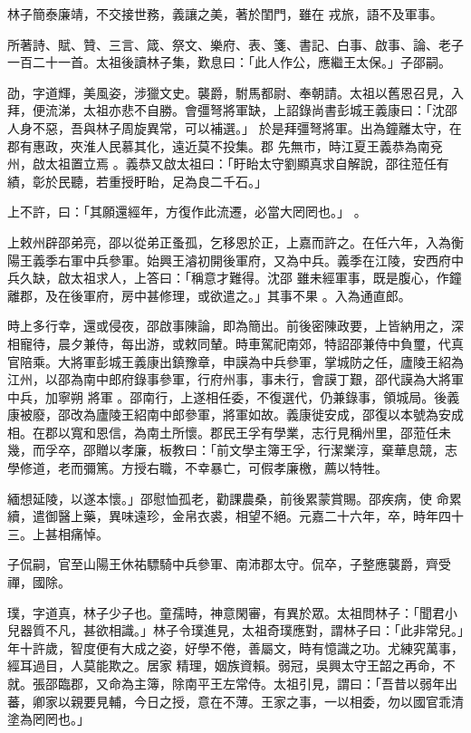\begin{pinyinscope}
 林子簡泰廉靖，不交接世務，義讓之美，著於閨門，雖在
 戎旅，語不及軍事。



 所著詩、賦、贊、三言、箴、祭文、樂府、表、箋、書記、白事、啟事、論、老子一百二十一首。太祖後讀林子集，歎息曰：「此人作公，應繼王太保。」子邵嗣。


劭，字道輝，美風姿，涉獵文史。襲爵，駙馬都尉、奉朝請。太祖以舊恩召見，入拜，便流涕，太祖亦悲不自勝。會彊弩將軍缺，上詔錄尚書彭城王義康曰：「沈邵人身不惡，吾與林子周旋異常，可以補選。」
 於是拜彊弩將軍。出為鐘離太守，在郡有惠政，夾淮人民慕其化，遠近莫不投集。郡
 先無市，時江夏王義恭為南兗州，啟太祖置立焉
 。義恭又啟太祖曰：「盱眙太守劉顯真求自解說，邵往蒞任有績，彰於民聽，若重授盱眙，足為良二千石。」


上不許，曰：「其願還經年，方復作此流遷，必當大罔罔也。」
 。


上敕州辟邵弟亮，邵以從弟正蚤孤，乞移恩於正，上嘉而許之。在任六年，入為衡陽王義季右軍中兵參軍。始興王濬初開後軍府，又為中兵。義季在江陵，安西府中兵久缺，啟太祖求人，上答曰：「稱意才難得。沈邵
 雖未經軍事，既是腹心，作鐘離郡，及在後軍府，房中甚修理，或欲遣之。」其事不果
 。入為通直郎。


時上多行幸，還或侵夜，邵啟事陳論，即為簡出。前後密陳政要，上皆納用之，深相寵待，晨夕兼侍，每出游，或敕同輦。時車駕祀南郊，特詔邵兼侍中負璽，代真官陪乘。大將軍彭城王義康出鎮豫章，申謨為中兵參軍，掌城防之任，廬陵王紹為江州，以邵為南中郎府錄事參軍，行府州事，事未行，會謨丁艱，邵代謨為大將軍中兵，加寧朔
 將軍
 。邵南行，上遂相任委，不復選代，仍兼錄事，領城局。後義康被廢，邵改為廬陵王紹南中郎參軍，將軍如故。義康徙安成，邵復以本號為安成相。在郡以寬和恩信，為南土所懷。郡民王孚有學業，志行見稱州里，邵蒞任未幾，而孚卒，邵贈以孝廉，板教曰：「前文學主簿王孚，行潔業淳，棄華息競，志學修道，老而彌篤。方授右職，不幸暴亡，可假孝廉檄，薦以特牲。



 緬想延陵，以遂本懷。」邵慰恤孤老，勸課農桑，前後累蒙賞賜。邵疾病，使
 命累續，遣御醫上藥，異味遠珍，金帛衣裘，相望不絕。元嘉二十六年，卒，時年四十三。上甚相痛悼。



 子侃嗣，官至山陽王休祐驃騎中兵參軍、南沛郡太守。侃卒，子整應襲爵，齊受禪，國除。



 璞，字道真，林子少子也。童孺時，神意閑審，有異於眾。太祖問林子：「聞君小兒器質不凡，甚欲相識。」林子令璞進見，太祖奇璞應對，謂林子曰：「此非常兒。」年十許歲，智度便有大成之姿，好學不倦，善屬文，時有憶識之功。尤練究萬事，經耳過目，人莫能欺之。居家
 精理，姻族資賴。弱冠，吳興太守王韶之再命，不就。張邵臨郡，又命為主簿，除南平王左常侍。太祖引見，謂曰：「吾昔以弱年出蕃，卿家以親要見輔，今日之授，意在不薄。王家之事，一以相委，勿以國官乖清塗為罔罔也。」




\end{pinyinscope}
